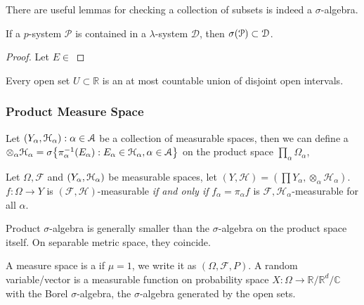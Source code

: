 There are useful lemmas for checking a collection of subsets is indeed a \(\sigma\)-algebra. 

\begin{lemma}
    If a \(p\)-system \(\mathcal{P}\) is contained in a \(\lambda\)-system \(\mathcal{D}\), then \(\sigma\pqty{\mathcal{P}} \subset \mathcal{D}\).
\end{lemma}
\begin{proof}
    Let \(E\in \mathcal{}\)
\end{proof}

\begin{lemma}
    
\end{lemma}

\begin{thm}
    Every open set \(U \subset \mathbb{R}\) is an at most countable union of disjoint open intervals. 
\end{thm}

\subsubsection{Product Measure Space}

Let \(\pqty{Y_{\alpha}, \mathcal{H}_{\alpha}}: \alpha\in \mathcal{A} \) be a collection of measurable spaces, then we can define a  \(\otimes_{\alpha} \mathcal{H}_{\alpha} = \sigma\Bqty{\pi_{\alpha}^{-1} (E_{\alpha}): E_{\alpha} \in \mathcal{H}_{\alpha}, \alpha \in \mathcal{A}}\) on the product space \(\prod_{\alpha} \Omega_{\alpha}\),  
\begin{proposition}
    Let \(\Omega, \mathcal{F}\) and \(\pqty{Y_{\alpha}, \mathcal{H}_{\alpha}}\) be measurable spaces, let \((Y, \mathcal{H}) = (\prod Y_{\alpha}, \otimes_{\alpha} \mathcal{H}_{\alpha})\). \(f : \Omega \to Y\) is \((\mathcal{F}, \mathcal{H})\)-measurable \textit{if and only if} \(f_{\alpha} = \pi_{\alpha} f\) is \(\mathcal{F} ,\mathcal{H}_{\alpha}\)-measurable for all \(\alpha\).
\end{proposition} 

\begin{proposition}
    Product \(\sigma\)-algebra is generally smaller than the \(\sigma\)-algebra on the product space itself. On separable metric space, they coincide. 
\end{proposition}

A measure space is a  if \(\mu =1\), we write it as \((\Omega, \mathcal{F}, P)\). A random variable/vector is a measurable function on probability space \(X: \Omega \to \mathbb{R}/\mathbb{R}^{d}/\mathbb{C}\) with the Borel \(\sigma\)-algebra, the \(\sigma\)-algebra generated by the open sets.

